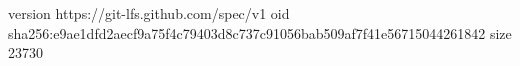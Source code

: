 version https://git-lfs.github.com/spec/v1
oid sha256:e9ae1dfd2aecf9a75f4c79403d8c737c91056bab509af7f41e56715044261842
size 23730
